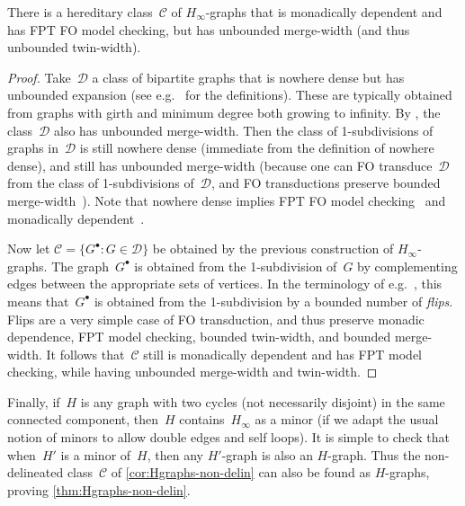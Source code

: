 \documentclass[a4paper,UKenglish,cleveref,thm-restate]{lipics-v2021}
\theoremstyle{remark}
\newcommand{\Cc}{\mathcal{C}}
\newcommand{\Dc}{\mathcal{D}}
\begin{document}
\begin{corollary}\label{cor:Hgraphs-non-delin}
    There is a hereditary class~$\Cc$ of $H_\infty$-graphs that is monadically dependent and has FPT FO model checking,
    but has unbounded merge-width (and thus unbounded twin-width).
\end{corollary}
\begin{proof}
    Take~$\Dc$ a class of bipartite graphs that is nowhere dense but has unbounded expansion (see e.g.~\cite{sparsity} for the definitions).
    These are typically obtained from graphs with girth and minimum degree both growing to infinity.
    By \cite[Corollary~1.8]{merge-width}, the class~$\Dc$ also has unbounded merge-width.
    Then the class of 1-subdivisions of graphs in~$\Dc$ is still nowhere dense (immediate from the definition of nowhere dense),
    and still has unbounded merge-width (because one can FO transduce~$\Dc$ from the class of 1-subdivisions of~$\Dc$, and FO transductions preserve bounded merge-width~\cite[Theorem~1.12]{merge-width}).
    Note that nowhere dense implies FPT FO model checking~\cite{grohe2017deciding} and monadically dependent~\cite{adler2014nowhereNIP}.
    
    Now let $\Cc = \{G^\bullet : G \in \Dc\}$ be obtained by the previous construction of $H_\infty$-graphs.
    The graph~$G^\bullet$ is obtained from the 1-subdivision of~$G$ by complementing edges between the appropriate sets of vertices.
    In the terminology of e.g.~\cite{flip-breakability}, this means that~$G^\bullet$ is obtained from the 1-subdivision by a bounded number of \emph{flips}.
    Flips are a very simple case of FO transduction, and thus preserve monadic dependence, FPT model checking, bounded twin-width, and bounded merge-width.
    It follows that~$\Cc$ still is monadically dependent and has FPT model checking, while having unbounded merge-width and twin-width.
\end{proof}

Finally, if~$H$ is any graph with two cycles (not necessarily disjoint) in the same connected component,
then~$H$ contains~$H_\infty$ as a minor (if we adapt the usual notion of minors to allow double edges and self loops).
It is simple to check that when~$H'$ is a minor of~$H$, then any $H'$-graph is also an $H$-graph.
Thus the non-delineated class~$\Cc$ of \cref{cor:Hgraphs-non-delin} can also be found as $H$-graphs, proving \cref{thm:Hgraphs-non-delin}.




\end{document}
